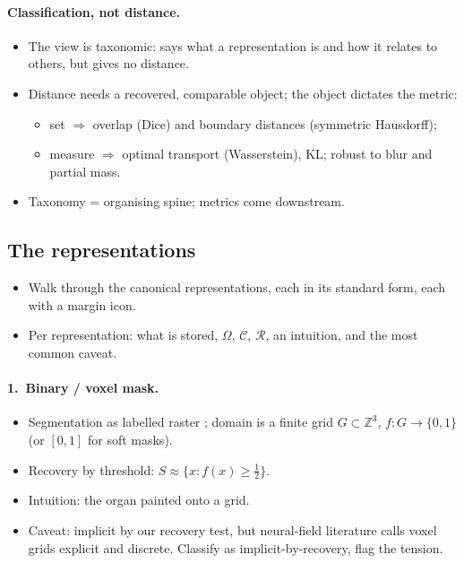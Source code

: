\paragraph{Classification, not distance.}
\begin{itemize}
    \item The view is taxonomic: says what a representation is and how it relates to others, but gives no distance.
    \item Distance needs a recovered, comparable object; the object dictates the metric:
    \begin{itemize}
        \item set $\Rightarrow$ overlap (Dice) and boundary distances (symmetric Hausdorff);
        \item measure $\Rightarrow$ optimal transport (Wasserstein), KL; robust to blur and partial mass.
    \end{itemize}
    \item Taxonomy = organising spine; metrics come downstream.
\end{itemize}

\subsection{The representations}
\label{sec:shape-reps}

\begin{itemize}
    \item Walk through the canonical representations, each in its standard form, each with a margin icon.
    \item Per representation: what is stored, $\Omega$, $\mathcal{C}$, $\mathcal{R}$, an intuition, and the most common caveat.
\end{itemize}

%
\paragraph{1.~Binary / voxel mask.}
\begin{itemize}
    \item Segmentation as labelled raster \citep{isensee2021nnunet}; domain is a finite grid $G \subset \mathbb{Z}^3$, $f : G \to \{0,1\}$ (or $[0,1]$ for soft masks).
    \item Recovery by threshold: $S \approx \{x : f(x) \ge \tfrac12\}$.
    \item Intuition: the organ painted onto a grid.
    \item Caveat: implicit by our recovery test, but neural-field literature calls voxel grids explicit and discrete. Classify as implicit-by-recovery, flag the tension.
\end{itemize}

